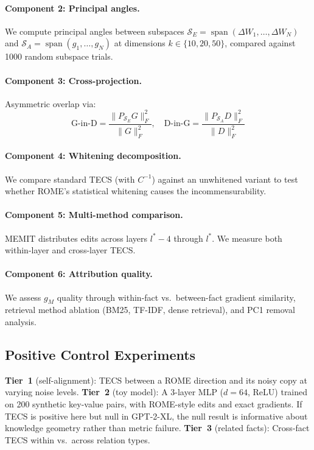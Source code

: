 \paragraph{Component 2: Principal angles.} We compute principal angles between subspaces $\mathcal{S}_E = \operatorname{span}(\Delta W_1, \ldots, \Delta W_N)$ and $\mathcal{S}_A = \operatorname{span}(g_1, \ldots, g_N)$ at dimensions $k \in \{10, 20, 50\}$, compared against 1000 random subspace trials.

\paragraph{Component 3: Cross-projection.} Asymmetric overlap via:
\begin{equation}
\text{G-in-D} = \frac{\|P_{\mathcal{S}_E} G\|_F^2}{\|G\|_F^2}, \quad
\text{D-in-G} = \frac{\|P_{\mathcal{S}_A} D\|_F^2}{\|D\|_F^2}
\label{eq:crossproj}
\end{equation}

\paragraph{Component 4: Whitening decomposition.} We compare standard TECS (with $C^{-1}$) against an unwhitened variant to test whether ROME's statistical whitening causes the incommensurability.

\paragraph{Component 5: Multi-method comparison.} MEMIT distributes edits across layers $l^*{-}4$ through $l^*$. We measure both within-layer and cross-layer TECS.

\paragraph{Component 6: Attribution quality.} We assess $g_M$ quality through within-fact vs.\ between-fact gradient similarity, retrieval method ablation (BM25, TF-IDF, dense retrieval), and PC1 removal analysis.

\subsection{Positive Control Experiments}
\label{sec:positive}

\textbf{Tier~1} (self-alignment): TECS between a ROME direction and its noisy copy at varying noise levels.
\textbf{Tier~2} (toy model): A 3-layer MLP ($d{=}64$, ReLU) trained on 200 synthetic key-value pairs, with ROME-style edits and exact gradients.
If TECS is positive here but null in GPT-2-XL, the null result is informative about knowledge geometry rather than metric failure.
\textbf{Tier~3} (related facts): Cross-fact TECS within vs.\ across relation types.
